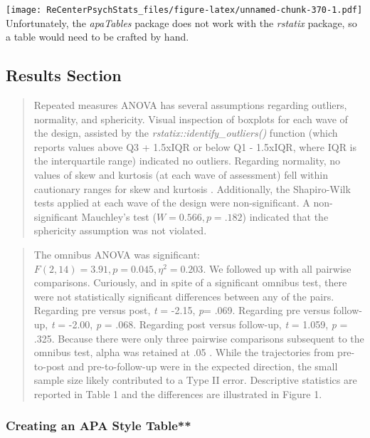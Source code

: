 \documentclass[
  11pt,
]{book}
\begin{document}
\texttt{[image: ReCenterPsychStats\_files/figure-latex/unnamed-chunk-370-1.pdf]}
Unfortunately, the \emph{apaTables} package does not work with the \emph{rstatix} package, so a table would need to be crafted by hand.

\hypertarget{results-section}{%
\subsection{Results Section}\label{results-section}}

\begin{quote}
Repeated measures ANOVA has several assumptions regarding outliers, normality, and sphericity. Visual inspection of boxplots for each wave of the design, assisted by the \emph{rstatix::identify\_outliers()} function (which reports values above Q3 + 1.5xIQR or below Q1 - 1.5xIQR, where IQR is the interquartile range) indicated no outliers. Regarding normality, no values of skew and kurtosis (at each wave of assessment) fell within cautionary ranges for skew and kurtosis \citep{kline_principles_2016}. Additionally, the Shapiro-Wilk tests applied at each wave of the design were non-significant. A non-significant Mauchley's test (\(W = 0.566, p = .182\)) indicated that the sphericity assumption was not violated.
\end{quote}

\begin{quote}
The omnibus ANOVA was significant: \(F(2,14) = 3.91, p = 0.045, \eta^2 = 0.203\). We followed up with all pairwise comparisons. Curiously, and in spite of a significant omnibus test, there were not statistically significant differences between any of the pairs. Regarding pre versus post, \emph{t} = -2.15, \emph{p}= .069. Regarding pre versus follow-up, \emph{t} = -2.00, \emph{p} = .068. Regarding post versus follow-up, \emph{t} = 1.059, \emph{p} = .325. Because there were only three pairwise comparisons subsequent to the omnibus test, alpha was retained at .05 \citep{green_using_2014}. While the trajectories from pre-to-post and pre-to-follow-up were in the expected direction, the small sample size likely contributed to a Type II error. Descriptive statistics are reported in Table 1 and the differences are illustrated in Figure 1.
\end{quote}

\hypertarget{creating-an-apa-style-table}{%
\subsubsection{Creating an APA Style Table**}\label{creating-an-apa-style-table}}
\end{document}
